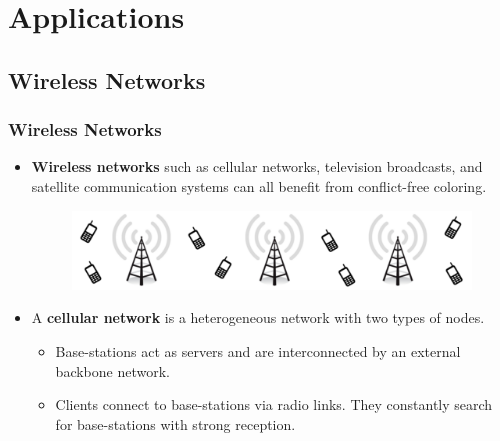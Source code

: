 \documentclass[xcolor=dvipsnames,aspectratio=1610]{beamer}
\begin{document}
  \section{Applications}

  \subsection{Wireless Networks}

  \begin{frame}
    \frametitle{Wireless Networks}

    \begin{itemize}
      \item \textbf{Wireless networks} such as cellular networks, television broadcasts, and satellite communication systems can all benefit from conflict-free coloring.

      \begin{figure}[h]
        \centering
        \includegraphics[width=12cm]{../figures/towers-slides.pdf}
      \end{figure}

      \pause

      \item A \textbf{cellular network} is a heterogeneous network with two types of nodes.

      \pause

      \begin{itemize}
        \item Base-stations act as servers and are interconnected by an external backbone network.
        \pause
        \item Clients connect to base-stations via radio links. They constantly search for base-stations with strong reception.
      \end{itemize}
    \end{itemize}

  \end{frame}
\end{document}
